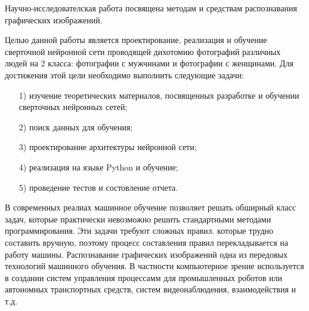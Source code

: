 \intro
Научно-исследователская работа посвящена методам и средствам распознавания графических изображений.

Целью данной работы является проектирование, реализация и обучение сверточной нейронной сети проводящей дихотомию фотографий различных людей на 2 класса: фотографии с мужчинами и фотографии с женщинами. Для достижения этой цели необходимо выполнить следующие задачи:

\begin{enumerate}
    \item [1)] изучение теоретических материалов, посвященных разработке и обучении сверточных нейронных сетей;
    \item [2)] поиск данных для обучения;
    \item [3)] проектирование архитектуры нейронной сети;
    \item [4)] реализация на языке Python и обучение;
    \item [5)] проведение тестов и состовление отчета.
\end{enumerate}



В современных реалиах машинное обучение позволяет решать обширный
класс задач, которые практически невозможно решить стандартными методами
программирования. Эти задачи требуют сложных правил. которые трудно составить вручную, поэтому процесс составления правил перекладывается на работу
машины. Распознавание графических изображений одна из передовых технологий машинного обучения. В частности компьютерное зрение используется в создании систем управления процессамм для промышленных роботов или автономных транспортных средств, систем видеонаблюдения, взаимодействия и т.д.

